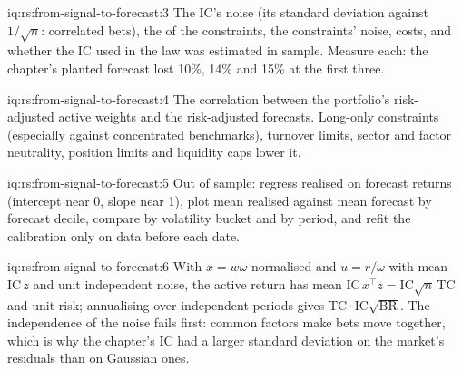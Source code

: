 \begin{solution}{iq:rs:from-signal-to-forecast:3}
The IC's noise (its standard deviation against $1/\sqrt n$: correlated bets), the  of the constraints, the constraints' noise, costs,
and whether the IC used in the law was estimated in sample. Measure each: the chapter's planted forecast lost 10\%, 14\% and 15\% at the first three.
\end{solution}

\begin{solution}{iq:rs:from-signal-to-forecast:4}
The correlation between the portfolio's risk-adjusted active weights and the risk-adjusted forecasts. Long-only constraints (especially against concentrated
benchmarks), turnover limits, sector and factor neutrality, position limits and liquidity caps lower it.
\end{solution}

\begin{solution}{iq:rs:from-signal-to-forecast:5}
Out of sample: regress realised on forecast returns (intercept near 0, slope near 1), plot mean realised against mean forecast by forecast decile, compare by
volatility bucket and by period, and refit the calibration only on data before each date.
\end{solution}

\begin{solution}{iq:rs:from-signal-to-forecast:6}
With $x = w\omega$ normalised and $u = r/\omega$ with mean $\mathrm{IC}\,z$ and unit independent noise, the active return has mean $\mathrm{IC}\,x^\top z =
\mathrm{IC}\sqrt n\,\mathrm{TC}$ and unit risk; annualising over independent periods gives $\mathrm{TC}\cdot\mathrm{IC}\sqrt{\mathrm{BR}}$. The independence of the
noise fails first: common factors make bets move together, which is why the chapter's IC had a larger standard deviation on the market's residuals than on
Gaussian ones.
\end{solution}

